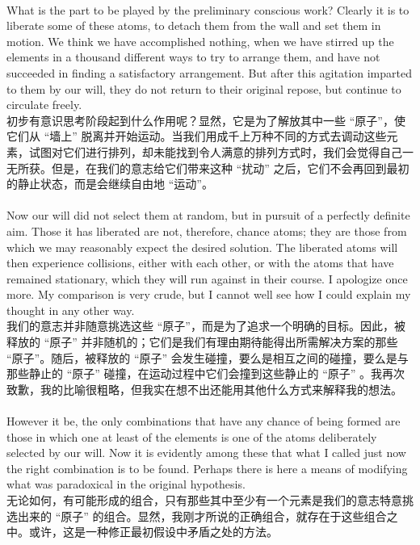\documentclass{article}
\begin{document}
\\
What is the part to be played by the preliminary conscious work? Clearly it is to liberate some of these atoms, to detach them from the wall and set them in motion. We think we have accomplished nothing, when we have stirred up the elements in a thousand different ways to try to arrange them, and have not succeeded in finding a satisfactory arrangement. But after this agitation imparted to them by our will, they do not return to their original repose, but continue to circulate freely.\\
初步有意识思考阶段起到什么作用呢？显然，它是为了解放其中一些 “原子”，使它们从 “墙上” 脱离并开始运动。当我们用成千上万种不同的方式去调动这些元素，试图对它们进行排列，却未能找到令人满意的排列方式时，我们会觉得自己一无所获。但是，在我们的意志给它们带来这种 “扰动” 之后，它们不会再回到最初的静止状态，而是会继续自由地 “运动”。 \\ 

\\
Now our will did not select them at random, but in pursuit of a perfectly definite aim. Those it has liberated are not, therefore, chance atoms; they are those from which we may reasonably expect the desired solution. The liberated atoms will then experience collisions, either with each other, or with the atoms that have remained stationary, which they will run against in their course. I apologize once more. My comparison is very crude, but I cannot well see how I could explain my thought in any other way.\\
我们的意志并非随意挑选这些 “原子”，而是为了追求一个明确的目标。因此，被释放的 “原子” 并非随机的；它们是我们有理由期待能得出所需解决方案的那些 “原子”。随后，被释放的 “原子” 会发生碰撞，要么是相互之间的碰撞，要么是与那些静止的 “原子” 碰撞，在运动过程中它们会撞到这些静止的 “原子” 。我再次致歉，我的比喻很粗略，但我实在想不出还能用其他什么方式来解释我的想法。\\  

\\
However it be, the only combinations that have any chance of being formed are those in which one at least of the elements is one of the atoms deliberately selected by our will. Now it is evidently among these that what I called just now the right combination is to be found. Perhaps there is here a means of modifying what was paradoxical in the original hypothesis.\\
无论如何，有可能形成的组合，只有那些其中至少有一个元素是我们的意志特意挑选出来的 “原子” 的组合。显然，我刚才所说的正确组合，就存在于这些组合之中。或许，这是一种修正最初假设中矛盾之处的方法。 \\ 
\end{document}
